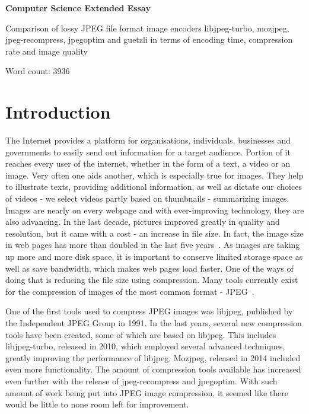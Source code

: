 \documentclass[12pt]{article}
\begin{document}
\begin{titlepage}
	{\centering
	{\phantom{a}\par}
	\vspace{2cm}
	{\Large\bfseries Computer Science Extended Essay\par}
	\vspace{1cm}
	{\Large Comparison of lossy JPEG file format image encoders libjpeg-turbo, mozjpeg, jpeg-recompress, jpegoptim and guetzli in terms of encoding time, compression rate and image quality\par}
	\vspace{0.5cm}
	{\large Word count: 3936\par}\par}
\end{titlepage}
\clearpage
\tableofcontents
\clearpage
\doublespacing
\section{Introduction}\label{introduction}
The Internet provides a platform for organisations, individuals, businesses and governments to easily send out information for a target audience. Portion of it reaches every user of the internet, whether in the form of a text, a video or an image. Very often one aids another, which is especially true for images. They help to illustrate texts, providing additional information, as well as dictate our choices of videos - we select videos partly based on thumbnails - summarizing images. Images are nearly on every webpage and with ever-improving technology, they are also advancing. In the last decade, pictures improved greatly in quality and resolution, but it came with a cost - an increase in file size. In fact, the image size in web pages has more than doubled in the last five years~\cite{httparchive}. As images are taking up more and more disk space, it is important to conserve limited storage space as well as save bandwidth, which makes web pages load faster. One of the ways of doing that is reducing the file size using compression. Many tools currently exist for the compression of images of the most common format - JPEG~\cite{httparchiveinteresting}.

One of the first tools used to compress JPEG images was libjpeg, published by the Independent JPEG Group in 1991. In the last years, several new compression tools have been created, some of which are based on libjpeg. This includes libjpeg-turbo, released in 2010, which employed several advanced techniques, greatly improving the performance of libjpeg. Mozjpeg, released in 2014 included even more functionality. The amount of compression tools available has increased even further with the release of jpeg-recompress and jpegoptim. With such amount of work being put into JPEG image compression, it seemed like there would be little to none room left for improvement.
\end{document}
